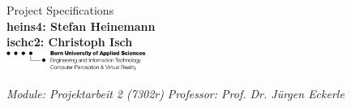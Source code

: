 
\begin{titlepage}
{\huge Project Specifications}\\
\textbf{heins4: Stefan Heinemann}\\
\textbf{ischc2: Christoph Isch}\\
\newline\newline\newline\newline\newline
\newline\newline\newline\newline\newline\newline\newline\newline\newline
\newline\newline\newline\newline\newline\newline\newline\newline
\includegraphics[width=46mm]{images/logo_ti.png}\newline

\emph{Module: Projektarbeit 2 (7302r)}\newline
\emph{Professor: Prof. Dr. Jürgen Eckerle}

\end{titlepage}
